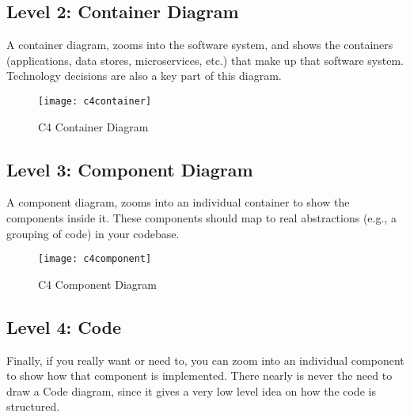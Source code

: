 \pagebreak

\subsection{Level 2: Container Diagram}
A container diagram, zooms into the software system, and shows the containers (applications, data stores, microservices, etc.) that make up that software system. Technology decisions are also a key part of this diagram.

\begin{figure}[H]
  \center
  \texttt{[image: c4container]}
  \caption{C4 Container Diagram}
\end{figure}

\subsection{Level 3: Component Diagram}
A component diagram, zooms into an individual container to show the components inside it. These components should map to real abstractions (e.g., a grouping of code) in your codebase.

\begin{figure}[H]
  \center
  \texttt{[image: c4component]}
  \caption{C4 Component Diagram}
\end{figure}

\subsection{Level 4: Code}
Finally, if you really want or need to, you can zoom into an individual component to show how that component is implemented. There nearly is never the need to draw a Code diagram, since it gives a very low level idea on how the code is structured.